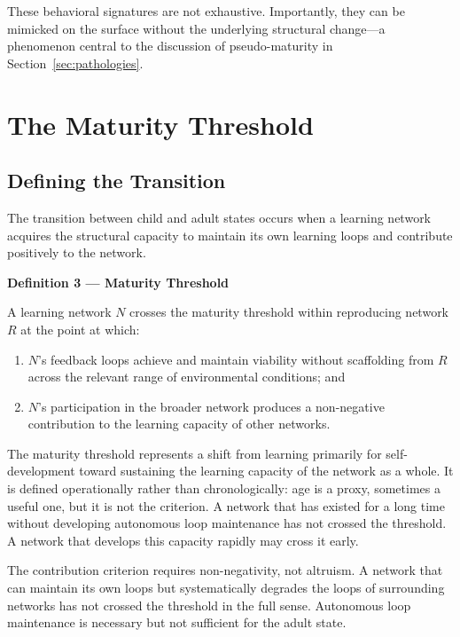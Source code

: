 \documentclass[11pt]{article}
\begin{document}
These behavioral signatures are not exhaustive. Importantly, they can be mimicked on the
surface without the underlying structural change---a phenomenon central to the discussion of
pseudo-maturity in Section~\ref{sec:pathologies}.

\section{The Maturity Threshold}

\subsection{Defining the Transition}

The transition between child and adult states occurs when a learning network acquires the
structural capacity to maintain its own learning loops and contribute positively to the network.

\begin{mdframed}
\textbf{Definition 3 --- Maturity Threshold}

A learning network $N$ crosses the maturity threshold within reproducing network $R$ at the
point at which:
\begin{enumerate}
    \item $N$'s feedback loops achieve and maintain viability without scaffolding from $R$
          across the relevant range of environmental conditions; and
    \item $N$'s participation in the broader network produces a non-negative contribution to
          the learning capacity of other networks.
\end{enumerate}
\end{mdframed}

The maturity threshold represents a shift from learning primarily for self-development toward
sustaining the learning capacity of the network as a whole. It is defined operationally rather
than chronologically: age is a proxy, sometimes a useful one, but it is not the criterion. A
network that has existed for a long time without developing autonomous loop maintenance has not
crossed the threshold. A network that develops this capacity rapidly may cross it early.

The contribution criterion requires non-negativity, not altruism. A network that can maintain
its own loops but systematically degrades the loops of surrounding networks has not crossed
the threshold in the full sense. Autonomous loop maintenance is necessary but not sufficient
for the adult state.
\end{document}
